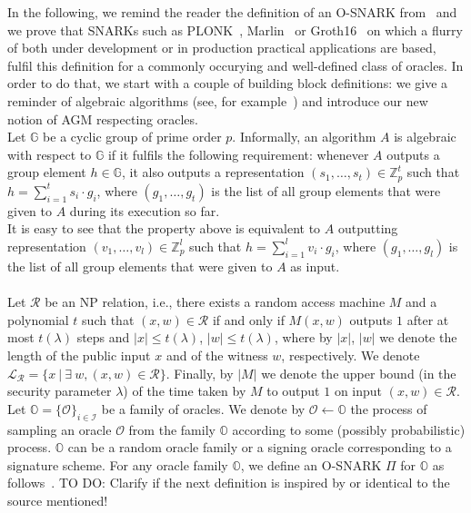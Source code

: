 In the following, we remind the reader the definition of an O-SNARK from~\cite{O_SNARK} and we prove that 
SNARKs such as PLONK~\cite{plonk}, Marlin~\cite{marlin} or Groth16~\cite{groth16} on which a flurry of 
both under development or in production practical applications are based, fulfil this definition for a commonly occurying 
and well-defined class of oracles. In order to do that, we start with a couple of building block definitions: we give a 
reminder of algebraic algorithms (see, for example~\cite{AGM_model}) and introduce our new notion of AGM respecting oracles. \\

\noindent Let $\mathbb{G}$ be a cyclic group of prime order $p$. Informally, an algorithm $A$ is algebraic with respect to 
$\mathbb{G}$ if it fulfils the following requirement: whenever $A$ outputs a group element $h \in \mathbb{G}$, 
it also outputs a representation $(s_1, \ldots, s_t) \in \mathbb{Z}^{t}_p$ 
such that $h = \sum_ {i =1}^t s_i \cdot g_i$, where $(g_1,\ldots,g_t)$ is the list of all group elements that were given to 
$A$ during its execution so far. \\

\noindent It is easy to see that the property above is equivalent to $A$ outputting  representation $(v_1, \ldots, v_l) \in \mathbb{Z}^{l}_p$ 
such that $h = \sum_ {i =1}^l v_i \cdot g_i$, where $(g_1,\ldots,g_l)$ is the list of all group elements that were given to $A$ as input. \\

\\
\noindent Let $\mathcal{R}$ be an NP relation, i.e., there exists a random access machine $M$ and a polynomial $t$ 
such that  $(x,w) \in \mathcal{R}$ if and only if $M(x,w)$ outputs $1$ after at most $t(\lambda)$ steps and 
$|x| \leq t(\lambda)$, $|w| \leq t(\lambda)$, where by $|x|$, $|w|$ we denote the length of the public input $x$ 
and of the witness $w$, respectively. We denote $\mathcal{L}_{\mathcal{R}} = \{ x\  | \ \exists \ w,  (x, w) \in \mathcal{R} \}$.  
Finally, by $|M|$ we denote the upper bound (in the security parameter $\lambda$) of the time taken by $M$ to output 
$1$ on input $(x,w) \in \mathcal{R}$.\\

\noindent Let $\mathbb{O} = \{ \mathcal{O} \}_{i \in \mathcal{I}}$ be a family of oracles. We denote by $\mathcal{O} \leftarrow \mathbb{O}$ 
the process of sampling an oracle $\mathcal{O}$ from the family $\mathbb{O}$ according to some (possibly probabilistic) process.
$\mathbb{O}$ can be a random oracle family or a signing oracle corresponding to a signature scheme. For any oracle family 
$\mathbb{O}$, we define an O-SNARK $\Pi$ for $\mathbb{O}$ as follows~\cite{O_SNARK}. {\color{red} TO DO: Clarify if the next definition is inspired by or identical to the source mentioned!} \\

